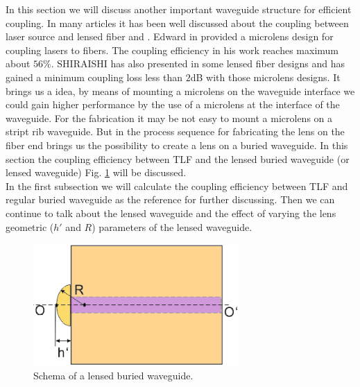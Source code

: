 In this section we will discuss another important waveguide structure for efficient coupling. In many articles it has been well discussed about the coupling between laser source and lensed fiber\cite{microlensese_to_fiber_coupling} and \cite{integrated_coupling _between_LD_SMF}.  Edward in \cite{microlensese_to_fiber_coupling} provided a microlens design for coupling lasers to fibers. The coupling efficiency in his work reaches maximum about $56\%$. SHIRAISHI has also presented in \cite{integrated_coupling _between_LD_SMF} some lensed fiber designs and has gained a minimum coupling loss less than $2$dB with those microlens designs. It brings us a idea, by means of mounting a microlens on the waveguide interface we could gain higher performance by the use of a microlens at the interface of the waveguide. For the fabrication it may be not easy to mount a microlens on a stript rib waveguide. But in \cite{lens_end_manufacture} the process sequence for fabricating the lens on the fiber end brings us the possibility to create a lens on a buried waveguide. In this section the coupling efficiency between TLF and the lensed buried waveguide (or lensed waveguide) Fig. \ref{fig:lensed_waveguide} will be discussed.\\

In the first subsection we will calculate the coupling efficiency between TLF and regular buried waveguide as the reference for further discussing. Then we can continue to talk about the lensed waveguide and the effect of varying the lens geometric ($h'$ and $R$) parameters of the lensed waveguide. \\

\begin{figure}[!ht]
\centering
\includegraphics[width=0.7\textwidth]{bilder/lensed_waveguide}
\caption{Schema of a lensed buried waveguide.}
\label{fig:lensed_waveguide}
\end{figure}
